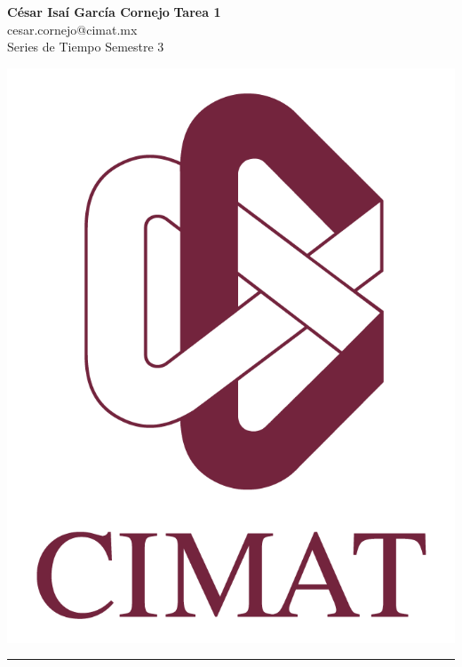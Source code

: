 \documentclass[a4paper, 11pt]{article}
\begin{document}
	\noindent
	
	\begin{minipage}[b][1.2cm][t]{0.8\textwidth}
		\large\textbf{César Isaí García Cornejo} \hfill \textbf{Tarea 1}  \\
		cesar.cornejo@cimat.mx \hfill \\
		\normalsize Series de Tiempo \hfill Semestre 3\\
	\end{minipage}
	
	\hspace{14.4cm}
	\begin{minipage}[b][0.03cm][t]{0.12\linewidth}
		
		\vspace{-2.2cm}
		\includegraphics[scale=0.3]{Figures/EscudoCimat.png}
	\end{minipage}
	
	\noindent\rule{7in}{2.8pt}
	
\end{document}
